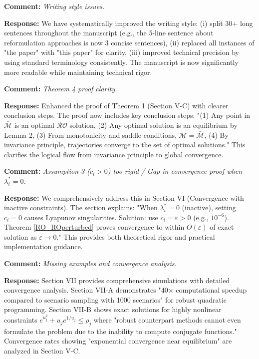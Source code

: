 \documentclass[journal,twoside,web]{ieeecolor}
\begin{document}
\textbf{Comment:} \textit{Writing style issues.}

\textbf{Response:} We have systematically improved the writing style: (i) split 30+ long sentences throughout the manuscript (e.g., the 5-line sentence about reformulation approaches is now 3 concise sentences), (ii) replaced all instances of "the paper" with "this paper" for clarity, (iii) improved technical precision by using standard terminology consistently. The manuscript is now significantly more readable while maintaining technical rigor.

\textbf{Comment:} \textit{Theorem 4 proof clarity.}

\textbf{Response:} Enhanced the proof of Theorem 1 (Section V-C) with clearer conclusion steps. The proof now includes key conclusion steps: "(1) Any point in $\bar{\mathcal{M}}$ is an optimal $\mathcal{RO}$ solution, (2) Any optimal solution is an equilibrium by Lemma 2, (3) From monotonicity and saddle conditions, $\mathcal{M} = \bar{\mathcal{M}}$, (4) By invariance principle, trajectories converge to the set of optimal solutions." This clarifies the logical flow from invariance principle to global convergence.

\textbf{Comment:} \textit{Assumption 3 ($c_i > 0$) too rigid / Gap in convergence proof when $\lambda_i^* = 0$.}

\textbf{Response:} We comprehensively address this in Section VI (Convergence with inactive constraints). The section explains: "When $\lambda_i^* = 0$ (inactive), setting $c_i = 0$ causes Lyapunov singularities. Solution: use $c_i = \varepsilon > 0$ (e.g., $10^{-6}$). Theorem \ref{RO_ROperturbed} proves convergence to within $O(\varepsilon)$ of exact solution as $\varepsilon \to 0$." This provides both theoretical rigor and practical implementation guidance.

\textbf{Comment:} \textit{Missing examples and convergence analysis.}

\textbf{Response:} Section VII provides comprehensive simulations with detailed convergence analysis. Section VII-A demonstrates "40× computational speedup compared to scenario sampling with 1000 scenarios" for robust quadratic programming. Section VII-B shows exact solutions for highly nonlinear constraints $e^{u_j^2}+u_j e^{1/u_j} \leq \rho_j$ where "robust counterpart methods cannot even formulate the problem due to the inability to compute conjugate functions." Convergence rates showing "exponential convergence near equilibrium" are analyzed in Section V-C.
\end{document}
